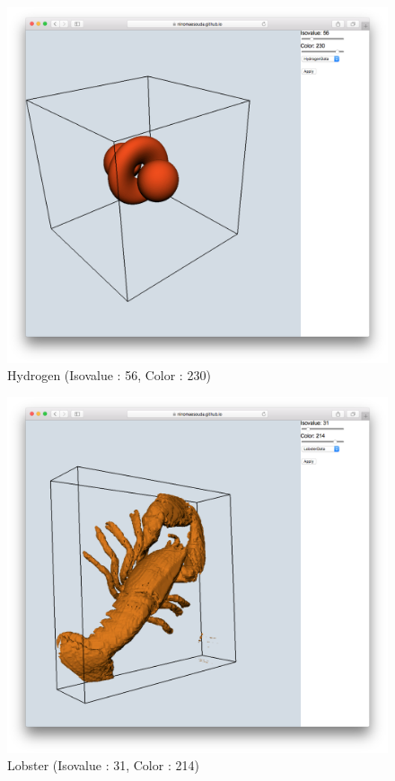 \documentclass[a4paper]{jsarticle}
\begin{document}
\begin{figure}[htbp]
\begin{minipage}{0.5\hsize}
\begin{center}
\includegraphics[scale = 0.18]{vis_hyd3.png}
\\ Hydrogen (Isovalue : 56, Color : 230)
\end{center}
\end{minipage}
\begin{minipage}{0.5\hsize}
\begin{center}
\includegraphics[scale = 0.18]{vis_lob3.png}
\\ Lobster (Isovalue : 31, Color : 214)
\end{center}
\end{minipage}
\end{figure}
\end{document}
